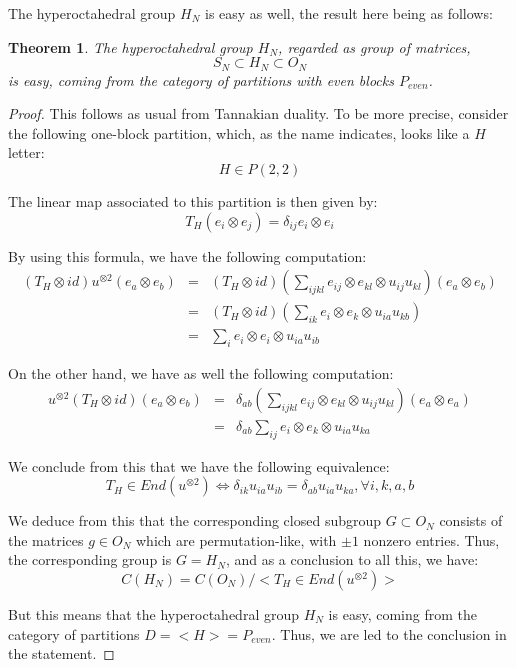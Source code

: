 \documentclass[12pt]{amsbook}
\newtheorem{theorem}{Theorem}[chapter]
\begin{document}
The hyperoctahedral group $H_N$ is easy as well, the result here being as follows:

\begin{theorem}
The hyperoctahedral group $H_N$, regarded as group of matrices,
$$S_N\subset H_N\subset O_N$$
is easy, coming from the category of partitions with even blocks $P_{even}$.
\end{theorem}

\begin{proof}
This follows as usual from Tannakian duality. To be more precise, consider the following one-block partition, which, as the name indicates, looks like a $H$ letter:
$$H\in P(2,2)$$

The linear map associated to this partition is then given by:
$$T_H(e_i\otimes e_j)=\delta_{ij}e_i\otimes e_i$$

By using this formula, we have the following computation:
\begin{eqnarray*}
(T_H\otimes id)u^{\otimes 2}(e_a\otimes e_b)
&=&(T_H\otimes id)\left(\sum_{ijkl}e_{ij}\otimes e_{kl}\otimes u_{ij}u_{kl}\right)(e_a\otimes e_b)\\
&=&(T_H\otimes id)\left(\sum_{ik}e_i\otimes e_k\otimes u_{ia}u_{kb}\right)\\
&=&\sum_ie_i\otimes e_i\otimes u_{ia}u_{ib}
\end{eqnarray*}

On the other hand, we have as well the following computation:
\begin{eqnarray*}
u^{\otimes 2}(T_H\otimes id)(e_a\otimes e_b)
&=&\delta_{ab}\left(\sum_{ijkl}e_{ij}\otimes e_{kl}\otimes u_{ij}u_{kl}\right)(e_a\otimes e_a)\\
&=&\delta_{ab}\sum_{ij}e_i\otimes e_k\otimes u_{ia}u_{ka}
\end{eqnarray*}

We conclude from this that we have the following equivalence:
$$T_H\in End(u^{\otimes 2})\iff \delta_{ik}u_{ia}u_{ib}=\delta_{ab}u_{ia}u_{ka},\forall i,k,a,b$$

We deduce from this that the corresponding closed subgroup $G\subset O_N$ consists of the matrices $g\in O_N$ which are permutation-like, with $\pm1$ nonzero entries. Thus, the corresponding group is $G=H_N$, and as a conclusion to all this, we have:
$$C(H_N)=C(O_N)\Big/\Big<T_H\in End(u^{\otimes 2})\Big>$$

But this means that the hyperoctahedral group $H_N$ is easy, coming from the category of partitions $D=<H>=P_{even}$. Thus, we are led to the conclusion in the statement.
\end{proof}
\end{document}

